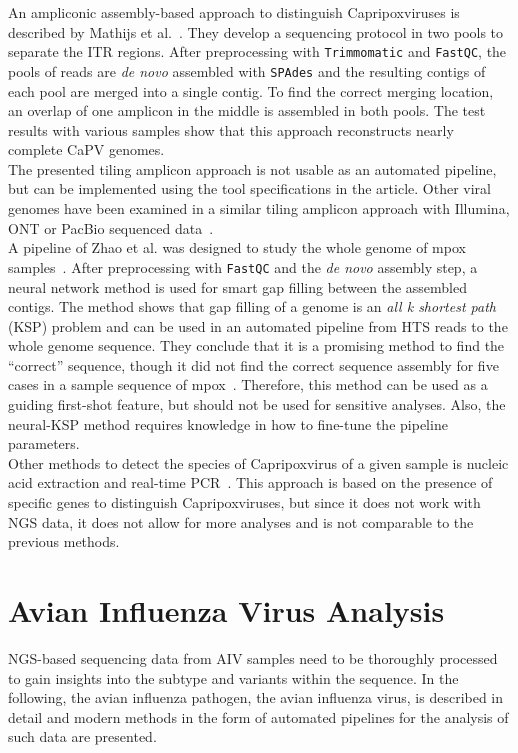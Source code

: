An ampliconic assembly-based approach to distinguish Capripoxviruses is described by Mathijs et al.~\cite{mathijs2022robust}. They develop a sequencing protocol in two pools to separate the \ac{ITR} regions. After preprocessing with \texttt{Trimmomatic} and \texttt{FastQC}, the pools of reads are \textit{de novo} assembled with \texttt{SPAdes} and the resulting contigs of each pool are merged into a single contig. To find the correct merging location, an overlap of one amplicon in the middle is assembled in both pools. The test results with various samples show that this approach reconstructs nearly complete \acs{CaPV} genomes. \\
The presented tiling amplicon approach is not usable as an automated pipeline, but can be implemented using the tool specifications in the article. Other viral genomes have been examined in a similar tiling amplicon approach with Illumina, \ac{ONT} or PacBio sequenced data~\cite{quick2017multiplex, grubaugh2019amplicon, freed2020rapid, gardner2014multiplex}. \\
A pipeline of Zhao et al. was designed to study the whole genome of mpox samples~\cite{zhao2016finishing}. After preprocessing with \texttt{FastQC} and the \textit{de novo} assembly step, a neural network method is used for smart gap filling between the assembled contigs. The method shows that gap filling of a genome is an \textit{all k shortest path} (KSP) problem and can be used in an automated pipeline from \ac{HTS} reads to the whole genome sequence. They conclude that it is a promising method to find the ``correct'' sequence, though it did not find the correct sequence assembly for five cases in a sample sequence of mpox~\cite{zhao2016finishing}. Therefore, this method can be used as a guiding first-shot feature, but should not be used for sensitive analyses. Also, the neural-\acs{KSP} method requires knowledge in how to fine-tune the pipeline parameters.\\
Other methods to detect the species of Capripoxvirus of a given sample is nucleic acid extraction and real-time \ac{PCR}~\cite{armson2017detection}. This approach is based on the presence of specific genes to distinguish Capripoxviruses, but since it does not work with \ac{NGS} data, it does not allow for more analyses and is not comparable to the previous methods.

\section{Avian Influenza Virus Analysis}\label{sec:AIV}
\ac{NGS}-based sequencing data from \ac{AIV} samples need to be thoroughly processed to gain insights into the subtype and variants within the sequence. In the following, the avian influenza pathogen, the avian influenza virus, is described in detail and modern methods in the form of automated pipelines for the analysis of such data are presented.

